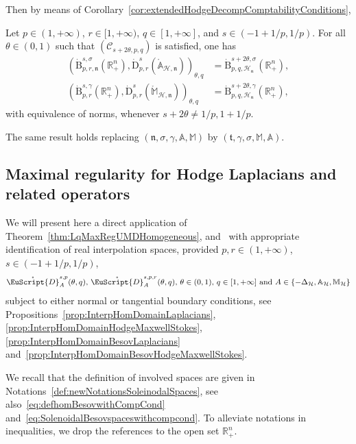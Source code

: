 \documentclass[AHL,Unicode,longabstracts,published]{cedram}
\newcommand{\bbA}{\mathbb{A}}
\newcommand{\bbR}{\mathbb{R}}
\newcommand{\bbM}{\mathbb{M}}
\newcommand{\rmB}{\mathrm{B}}
\newcommand{\rmD}{\mathrm{D}}
\newcommand{\clH}{\mathcal{H}}
\newcommand{\clC}{\mathcal{C}}
\newcommand{\fkn}{\mathfrak{n}}
\newcommand{\fkt}{\mathfrak{t}}
\newcommand{\rgeusD}{\mathring{\eus{D}}}
\newcommand{\eus}{\EuScript}
\begin{document}
Then by means of Corollary~\ref{cor:extendedHodgeDecompComptabilityConditions},

\begin{prop}\label{prop:InterpHomDomainBesovHodgeMaxwellStokes}
Let $p\in(1,+\infty)$, $r\in[1,+\infty)$, $q\in[1,+\infty]$, and $s\in(-1+1/p,1/p)$. For all $\theta\in(0,1)$ such that $(\clC_{s+2\theta,p,q})$ is satisfied, one has
\begin{align*}
\left(\dot{\rmB}^{s,\sigma}_{p,r,\fkn}\left(\bbR^n_+\right),\dot{\rmD}^{s}_{p,r}
\left(\mathring{\bbA}_{\clH,\fkn}\right)\right)_{\theta,q} &= \dot{\rmB}^{s+2\theta,\sigma}_{p,q,\clH_{\fkn}}\left(\bbR^n_+\right),\\
\left(\dot{\rmB}^{s,\gamma}_{p,r}\left(\bbR^n_+\right),\dot{\rmD}^{s}_{p,r}\left(\mathring{\bbM}_{\clH,\fkn}\right)\right)_{\theta,q} &= \dot{\rmB}^{s+2\theta,\gamma}_{p,q,\clH_{\fkn}}\left(\bbR^n_+\right),
\end{align*}
with equivalence of norms, whenever $s+2\theta\neq 1/p,1+1/p$.

The same result holds replacing $(\fkn,\sigma,\gamma,\bbA,\bbM)$ by $(\fkt,\gamma,\sigma,\bbM,\bbA)$.
\end{prop}



\subsection{Maximal regularity for Hodge Laplacians and related operators}\label{sec:maxRegMaxHodgeStokes}


We will present here a direct application of Theorem~\ref{thm:LqMaxRegUMDHomogeneous}, and~\cite[Theorem~2.20]{DanchinHieberMuchaTolk2020} with appropriate identification of real interpolation spaces, provided $p,r\in(1,+\infty)$, $s\in(-1+1/p,1/p)$,
\begin{align*}
\rgeusD^{s,p}_{A}(\theta,q) \text{, }\rgeusD^{s,p,r}_{A}(\theta,q) \text{, } \theta\in(0,1) \text{, } q\in[1,+\infty] \text{ and } A\in\left\{-\Delta_{\clH},\bbA_\clH,\bbM_\clH\right\}
\end{align*}
subject to either normal or tangential boundary conditions, see Propositions~\ref{prop:InterpHomDomainLaplacians}, \ref{prop:InterpHomDomainHodgeMaxwellStokes}, \ref{prop:InterpHomDomainBesovLaplacians} and~\ref{prop:InterpHomDomainBesovHodgeMaxwellStokes}.

We recall that the definition of involved spaces are given in Notations~\ref{def:newNotationsSoleinodalSpaces}, see also~\eqref{eq:defhomBesovwithCompCond} and~\eqref{eq:SolenoidalBesovspaceswithcompcond}. To alleviate notations in inequalities, we drop the references to the open set $\bbR^n_+$.
\end{document}
